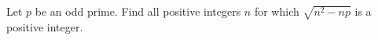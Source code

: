 Let $p$ be an odd prime. Find all positive integers $n$ for which $\sqrt{n^2-np}$ is a positive integer.
